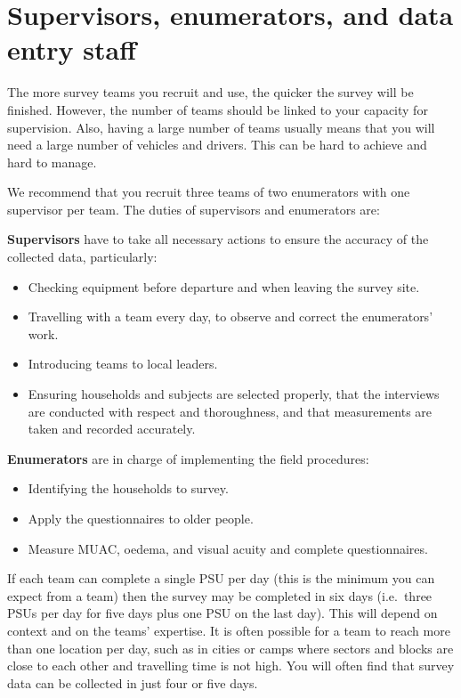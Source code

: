 \documentclass[12pt,a4paper]{book}
\providecommand{\tightlist}{%
  \setlength{\itemsep}{0pt}\setlength{\parskip}{0pt}}
\theoremstyle{definition}
\theoremstyle{definition}
\theoremstyle{definition}
\theoremstyle{remark}
\begin{document}
\hypertarget{supervisors-enumerators-and-data-entry-staff}{%
\section{Supervisors, enumerators, and data entry
staff}\label{supervisors-enumerators-and-data-entry-staff}}

The more survey teams you recruit and use, the quicker the survey will
be finished. However, the number of teams should be linked to your
capacity for supervision. Also, having a large number of teams usually
means that you will need a large number of vehicles and drivers. This
can be hard to achieve and hard to manage.

We recommend that you recruit three teams of two enumerators with one
supervisor per team. The duties of supervisors and enumerators are:

\textbf{Supervisors} have to take all necessary actions to ensure the
accuracy of the collected data, particularly:

\begin{itemize}
\tightlist
\item
  Checking equipment before departure and when leaving the survey site.
\item
  Travelling with a team every day, to observe and correct the
  enumerators' work.
\item
  Introducing teams to local leaders.
\item
  Ensuring households and subjects are selected properly, that the
  interviews are conducted with respect and thoroughness, and that
  measurements are taken and recorded accurately.
\end{itemize}

\textbf{Enumerators} are in charge of implementing the field procedures:

\begin{itemize}
\tightlist
\item
  Identifying the households to survey.
\item
  Apply the questionnaires to older people.
\item
  Measure MUAC, oedema, and visual acuity and complete questionnaires.
\end{itemize}

If each team can complete a single PSU per day (this is the minimum you
can expect from a team) then the survey may be completed in six days
(i.e.~three PSUs per day for five days plus one PSU on the last day).
This will depend on context and on the teams' expertise. It is often
possible for a team to reach more than one location per day, such as in
cities or camps where sectors and blocks are close to each other and
travelling time is not high. You will often find that survey data can be
collected in just four or five days.
\end{document}
